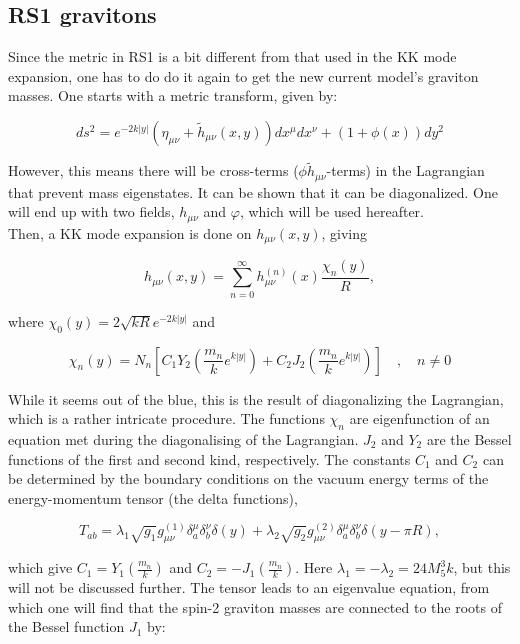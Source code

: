 \documentclass[11pt,a4paper]{article}
\begin{document}
\subsection{RS1 gravitons}
Since the metric in RS1 is a bit different from that used in the KK mode expansion, one has to do do it again to get the new current model's graviton masses. One starts with a metric transform, given by:

\begin{equation}
	ds^2 = e^{-2k|y|}(\eta_{\mu\nu} + \tilde{h}_{\mu\nu}(x,y))dx^\mu dx^\nu + (1+\phi(x))dy^2
\end{equation}

However, this means there will be cross-terms ($\phi \tilde{h}_{\mu\nu}$-terms) in the Lagrangian that prevent mass eigenstates. It can be shown\cite{BKSV} that it can be diagonalized. One will end up with two fields, $h_{\mu\nu}$ and $\varphi$, which will be used hereafter.\\
Then, a KK mode expansion is done on $h_{\mu\nu}(x,y)$, giving

\begin{equation}
	h_{\mu\nu}(x,y) = \sum_{n=0}^{\infty} h_{\mu\nu}^{(n)}(x)\frac{\chi_n(y)}{R},
\end{equation}

where $\chi_0(y) = 2\sqrt{kR}e^{-2k|y|}$ and

\begin{equation}
	\chi_n(y) = N_n\left[ C_1Y_2\left(\frac{m_n}{k}e^{k|y|}\right) +   C_2J_2\left(\frac{m_n}{k}e^{k|y|}\right)\right] \quad,\quad n\neq 0
\end{equation}

While it seems out of the blue, this is the result of diagonalizing the Lagrangian, which is a rather intricate procedure. The functions $\chi_n$ are eigenfunction of an equation met during the diagonalising of the Lagrangian. $J_2$ and $Y_2$ are the Bessel functions of the first and second kind, respectively. The constants $C_1$ and $C_2$ can be determined by the boundary conditions on the vacuum energy terms of the energy-momentum tensor (the delta functions),

\begin{equation}
	T_{ab} = \lambda_1\sqrt{g_1}g_{\mu\nu}^{(1)}\delta_a^\mu\delta_b^\nu\delta(y) + \lambda_2\sqrt{g_2}g_{\mu\nu}^{(2)}\delta_a^\mu\delta_b^\nu\delta(y-\pi R),
\end{equation}

which give $C_1 = Y_1\left(\frac{m_n}{k}\right)$ and $C_2 = -J_1\left(\frac{m_n}{k}\right)$. Here $\lambda_1 = -\lambda_2 = 24M_5^3k$, but this will not be discussed further. The tensor leads to an eigenvalue equation, from which one will find that the spin-2 graviton masses are connected to the roots of the Bessel function $J_1$ by:
\end{document}
